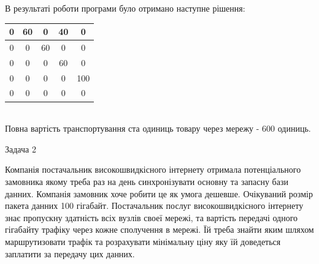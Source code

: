 \documentclass[a4paper,14pt,russian,ukrainian,oneside,final]{extreport}
\begin{document}
\indent В результаті роботи програми було отримано наступне рішення:
\begin{center}
\begin{tabular}{|c|c|c|c|c|}
\hline
0&60&0&40&0 \\
\hline
0&0&60&0&0 \\
\hline
0&0&0&60&0 \\
\hline
0&0&0&0&100\\
\hline
0&0&0&0&0 \\
\hline
\end{tabular} \\
Повна вартість транспортування ста одиниць товару через мережу - 600 одиниць.
\end{center}

Задача 2

\indent
Компанія постачальник високошвидкісного інтернету отримала потенціального замовника якому треба раз на день синхронізувати основну та запасну бази данних. Компанія замовник хоче робити це як умога дешевше. Очікуваний розмір пакета данних 100 гігабайт. 
Постачальник послуг високошвидкісного інтернету знає пропускну здатність всіх вузлів своеї мережі, та вартість передачі одного гігабайту трафіку через кожне сполучення в мережі.
Їй треба знайти яким шляхом маршрутизовати трафік та розрахувати мінімальну ціну яку їй доведеться заплатити за передачу цих данних.
\end{document}
